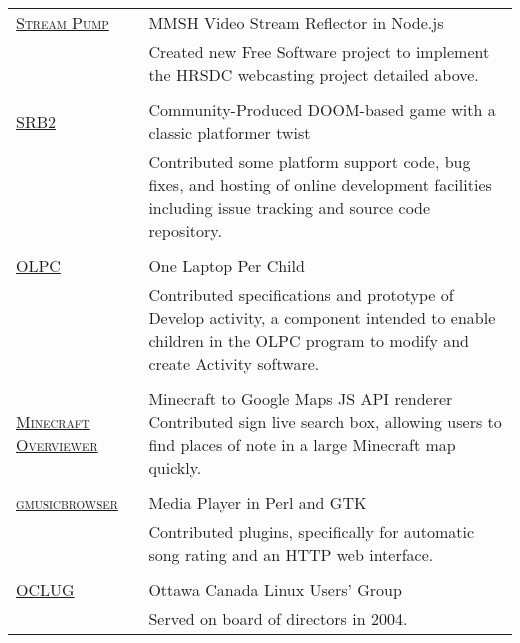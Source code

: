 \documentclass[letterpaper,10pt]{article}
\begin{document}
\begin{longtable}{p{3cm}|p{12cm}}
  \textsc{\href{https://github.com/orospakr/stream-pump}{Stream Pump}} & MMSH Video Stream Reflector in Node.js \\
   & \footnotesize{Created new Free Software project to implement the HRSDC webcasting project detailed above.} \\
  \multicolumn{2}{c}{} \\
  \textsc{\href{http://www.srb2.org}{SRB2}} & Community-Produced DOOM-based game with a classic platformer twist \\
   & \footnotesize{Contributed some platform support code, bug fixes, and hosting of online development facilities including issue tracking and source code repository.} \\
  \multicolumn{2}{c}{} \\
  \textsc{\href{http://www.laptop.org}{OLPC}} & One Laptop Per Child \\
   & \footnotesize{Contributed specifications and prototype of Develop activity, a component intended to enable children in the OLPC program to modify and create Activity software.} \\
  \multicolumn{2}{c}{} \\
  \textsc{\href{https://github.com/brownan/Minecraft-Overviewer}{Minecraft Overviewer}} & Minecraft to Google Maps JS API renderer \newline \footnotesize{Contributed sign live search box, allowing users to find places of note in a large Minecraft map quickly.} \\
  \multicolumn{2}{c}{} \\
  \textsc{\href{http://www.gmusicbrowser.org}{gmusicbrowser}} & Media Player in Perl and GTK \\
   & \footnotesize{Contributed plugins, specifically for automatic song rating and an HTTP web interface.} \\
  \multicolumn{2}{c}{} \\
  \textsc{\href{http://www.oclug.on.ca}{OCLUG}} & Ottawa Canada Linux Users' Group \\
   & \footnotesize{Served on board of directors in 2004.}
\end{longtable}
\end{document}
